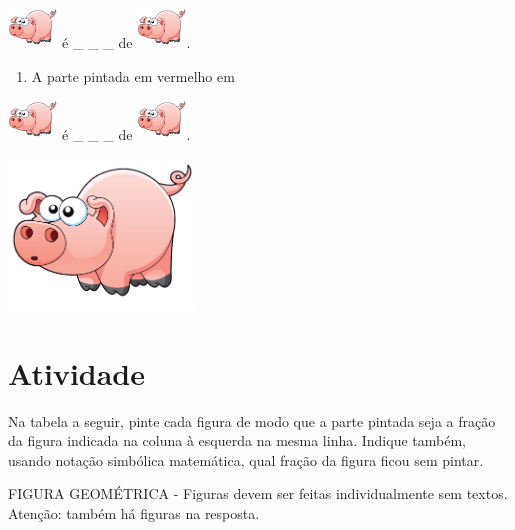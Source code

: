 \documentclass[a4,12pt]{book}
\begin{document}
\includegraphics[height=30pt, keepaspectratio]{pig} é \_ \_ \_   de \includegraphics[height=30pt, keepaspectratio]{pig}.
\begin{enumerate} [\quad a)] %
  \item     A parte pintada em vermelho em 
\end{enumerate} %
\includegraphics[height=30pt, keepaspectratio]{pig} é \_ \_ \_   de \includegraphics[height=30pt, keepaspectratio]{pig}.






\includegraphics[width=\textwidth,height=4cm, keepaspectratio]{pig}
\section{Atividade}







Na tabela a seguir, pinte cada figura de modo que a parte pintada seja a fração da figura indicada na coluna à esquerda na mesma linha. Indique também, usando notação simbólica matemática, qual fração da figura ficou sem pintar.
\begin{imagem*}[breakable]{}{}   FIGURA GEOMÉTRICA - Figuras devem ser feitas individualmente sem textos. Atenção: também há figuras na resposta. \end{imagem*}
\end{document}
